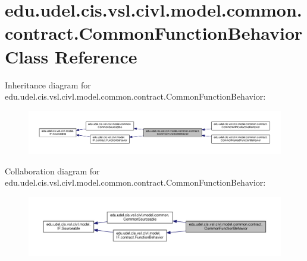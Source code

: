 \hypertarget{classedu_1_1udel_1_1cis_1_1vsl_1_1civl_1_1model_1_1common_1_1contract_1_1CommonFunctionBehavior}{}\section{edu.\+udel.\+cis.\+vsl.\+civl.\+model.\+common.\+contract.\+Common\+Function\+Behavior Class Reference}
\label{classedu_1_1udel_1_1cis_1_1vsl_1_1civl_1_1model_1_1common_1_1contract_1_1CommonFunctionBehavior}


Inheritance diagram for edu.\+udel.\+cis.\+vsl.\+civl.\+model.\+common.\+contract.\+Common\+Function\+Behavior\+:
\nopagebreak
\begin{figure}[H]
\begin{center}
\leavevmode
\includegraphics[width=350pt]{classedu_1_1udel_1_1cis_1_1vsl_1_1civl_1_1model_1_1common_1_1contract_1_1CommonFunctionBehavior__inherit__graph}
\end{center}
\end{figure}


Collaboration diagram for edu.\+udel.\+cis.\+vsl.\+civl.\+model.\+common.\+contract.\+Common\+Function\+Behavior\+:
\nopagebreak
\begin{figure}[H]
\begin{center}
\leavevmode
\includegraphics[width=350pt]{classedu_1_1udel_1_1cis_1_1vsl_1_1civl_1_1model_1_1common_1_1contract_1_1CommonFunctionBehavior__coll__graph}
\end{center}
\end{figure}
